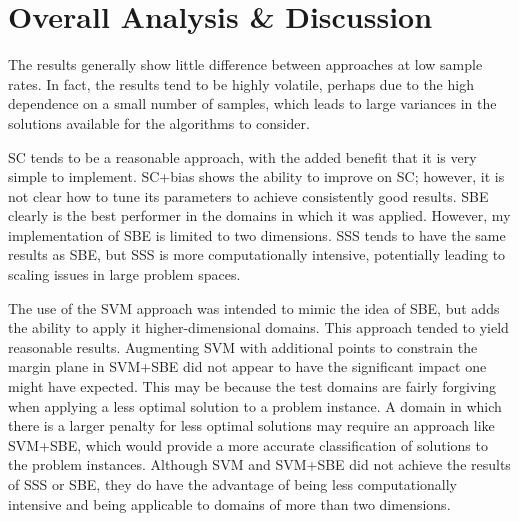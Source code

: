 

\section{Overall Analysis \& Discussion}

The results generally show little difference between approaches at low sample rates.  In fact, the results tend to be highly volatile, perhaps due to the high dependence on a small number of samples, which leads to large variances in the solutions available for the algorithms to consider.

SC tends to be a reasonable approach, with the added benefit that it is very simple to implement.  SC+bias shows the ability to improve on SC; however, it is not clear how to tune its parameters to achieve consistently good results.  SBE clearly is the best performer in the domains in which it was applied.  However, my implementation of SBE is limited to two dimensions.  SSS tends to have  the same results as SBE, but SSS is more computationally intensive, potentially leading to scaling issues in large problem spaces.  

The use of the SVM approach was intended to mimic the idea of SBE, but adds the ability to apply it higher-dimensional domains.  This approach tended to yield reasonable results.  Augmenting SVM with additional points to constrain the margin plane in SVM+SBE did not appear to have the significant impact one might have expected.  This may be because the test domains are fairly forgiving when applying a less optimal solution to a problem instance.  A domain in which there is a larger penalty for less optimal solutions may require an approach like SVM+SBE, which would provide a more accurate classification of solutions to the problem instances.  Although SVM and SVM+SBE did not achieve the results of SSS or SBE, they do have the advantage of being less computationally intensive and being applicable to domains of more than two dimensions.

